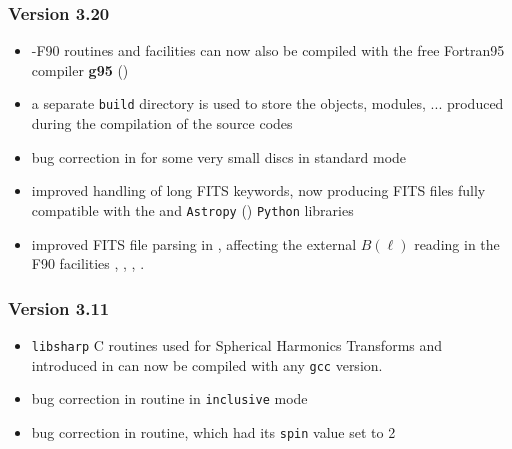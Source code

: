\documentclass[12pt,twoside]{article}
\newcommand{\compresslist}{%
\setlength{\itemsep}{0ex}}{}
\begin{document}
{\subsubsection{Version 3.20} %
\label{sub:new3p20}
\begin{itemize}\compresslist
	\item \healpixns-F90 routines and facilities can now also be compiled with
the free Fortran95 compiler \textbf{g95} ()
	\item a separate {\tt build} directory is used to store the objects,
modules, ... produced during the compilation of the source codes
	\item bug correction in  for
some very small discs in standard mode
	\item improved handling of long FITS keywords, now producing FITS files
fully compatible with the
and 
{\tt Astropy} ()
{\tt Python} libraries
	\item improved FITS file parsing in 
,
affecting the external $B(\ell)$ reading in the F90 facilities 
, 
, 
, 
.
\end{itemize}

\subsubsection{Version 3.11} %
\label{sub:new3p11}
\begin{itemize}\compresslist
	\item {\tt libsharp} C routines used for Spherical Harmonics Transforms 
	and introduced in 
	can now be compiled with any {\tt gcc} version.
	\item bug correction in 
	routine in {\tt inclusive} mode
	\item bug correction in  
	routine, which had its {\tt spin} value set to 2
\end{itemize}

}
\end{document}
